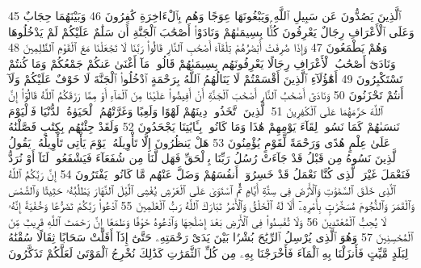 {\tiny\colorbox{cl_aya}{45}} ٱلَّذِينَ يَصُدُّونَ عَن سَبِيلِ ٱللَّهِ وَيَبْغُونَهَا عِوَجًا وَهُم بِٱلْءَاخِرَةِ كَٰفِرُونَ
{\tiny\colorbox{cl_aya}{46}} وَبَيْنَهُمَا حِجَابٌ وَعَلَى ٱلْأَعْرَافِ رِجَالٌ يَعْرِفُونَ كُلًّۢا بِسِيمَىٰهُمْ وَنَادَوْا۟ أَصْحَٰبَ ٱلْجَنَّةِ أَن سَلَٰمٌ عَلَيْكُمْ لَمْ يَدْخُلُوهَا وَهُمْ يَطْمَعُونَ
{\tiny\colorbox{cl_aya}{47}} وَإِذَا صُرِفَتْ أَبْصَٰرُهُمْ تِلْقَآءَ أَصْحَٰبِ ٱلنَّارِ قَالُوا۟ رَبَّنَا لَا تَجْعَلْنَا مَعَ ٱلْقَوْمِ ٱلظَّٰلِمِينَ
{\tiny\colorbox{cl_aya}{48}} وَنَادَىٰٓ أَصْحَٰبُ ٱلْأَعْرَافِ رِجَالًا يَعْرِفُونَهُم بِسِيمَىٰهُمْ قَالُوا۟ مَآ أَغْنَىٰ عَنكُمْ جَمْعُكُمْ وَمَا كُنتُمْ تَسْتَكْبِرُونَ
{\tiny\colorbox{cl_aya}{49}} أَهَٰٓؤُلَآءِ ٱلَّذِينَ أَقْسَمْتُمْ لَا يَنَالُهُمُ ٱللَّهُ بِرَحْمَةٍ ٱدْخُلُوا۟ ٱلْجَنَّةَ لَا خَوْفٌ عَلَيْكُمْ وَلَآ أَنتُمْ تَحْزَنُونَ
{\tiny\colorbox{cl_aya}{50}} وَنَادَىٰٓ أَصْحَٰبُ ٱلنَّارِ أَصْحَٰبَ ٱلْجَنَّةِ أَنْ أَفِيضُوا۟ عَلَيْنَا مِنَ ٱلْمَآءِ أَوْ مِمَّا رَزَقَكُمُ ٱللَّهُ قَالُوٓا۟ إِنَّ ٱللَّهَ حَرَّمَهُمَا عَلَى ٱلْكَٰفِرِينَ
{\tiny\colorbox{cl_aya}{51}} ٱلَّذِينَ ٱتَّخَذُوا۟ دِينَهُمْ لَهْوًا وَلَعِبًا وَغَرَّتْهُمُ ٱلْحَيَوٰةُ ٱلدُّنْيَا فَٱلْيَوْمَ نَنسَىٰهُمْ كَمَا نَسُوا۟ لِقَآءَ يَوْمِهِمْ هَٰذَا وَمَا كَانُوا۟ بِـَٔايَٰتِنَا يَجْحَدُونَ
{\tiny\colorbox{cl_aya}{52}} وَلَقَدْ جِئْنَٰهُم بِكِتَٰبٍ فَصَّلْنَٰهُ عَلَىٰ عِلْمٍ هُدًى وَرَحْمَةً لِّقَوْمٍ يُؤْمِنُونَ
{\tiny\colorbox{cl_aya}{53}} هَلْ يَنظُرُونَ إِلَّا تَأْوِيلَهُۥ يَوْمَ يَأْتِى تَأْوِيلُهُۥ يَقُولُ ٱلَّذِينَ نَسُوهُ مِن قَبْلُ قَدْ جَآءَتْ رُسُلُ رَبِّنَا بِٱلْحَقِّ فَهَل لَّنَا مِن شُفَعَآءَ فَيَشْفَعُوا۟ لَنَآ أَوْ نُرَدُّ فَنَعْمَلَ غَيْرَ ٱلَّذِى كُنَّا نَعْمَلُ قَدْ خَسِرُوٓا۟ أَنفُسَهُمْ وَضَلَّ عَنْهُم مَّا كَانُوا۟ يَفْتَرُونَ
{\tiny\colorbox{cl_aya}{54}} إِنَّ رَبَّكُمُ ٱللَّهُ ٱلَّذِى خَلَقَ ٱلسَّمَٰوَٰتِ وَٱلْأَرْضَ فِى سِتَّةِ أَيَّامٍ ثُمَّ ٱسْتَوَىٰ عَلَى ٱلْعَرْشِ يُغْشِى ٱلَّيْلَ ٱلنَّهَارَ يَطْلُبُهُۥ حَثِيثًا وَٱلشَّمْسَ وَٱلْقَمَرَ وَٱلنُّجُومَ مُسَخَّرَٰتٍۭ بِأَمْرِهِۦٓ أَلَا لَهُ ٱلْخَلْقُ وَٱلْأَمْرُ تَبَارَكَ ٱللَّهُ رَبُّ ٱلْعَٰلَمِينَ
{\tiny\colorbox{cl_aya}{55}} ٱدْعُوا۟ رَبَّكُمْ تَضَرُّعًا وَخُفْيَةً إِنَّهُۥ لَا يُحِبُّ ٱلْمُعْتَدِينَ
{\tiny\colorbox{cl_aya}{56}} وَلَا تُفْسِدُوا۟ فِى ٱلْأَرْضِ بَعْدَ إِصْلَٰحِهَا وَٱدْعُوهُ خَوْفًا وَطَمَعًا إِنَّ رَحْمَتَ ٱللَّهِ قَرِيبٌ مِّنَ ٱلْمُحْسِنِينَ
{\tiny\colorbox{cl_aya}{57}} وَهُوَ ٱلَّذِى يُرْسِلُ ٱلرِّيَٰحَ بُشْرًۢا بَيْنَ يَدَىْ رَحْمَتِهِۦ حَتَّىٰٓ إِذَآ أَقَلَّتْ سَحَابًا ثِقَالًا سُقْنَٰهُ لِبَلَدٍ مَّيِّتٍ فَأَنزَلْنَا بِهِ ٱلْمَآءَ فَأَخْرَجْنَا بِهِۦ مِن كُلِّ ٱلثَّمَرَٰتِ كَذَٰلِكَ نُخْرِجُ ٱلْمَوْتَىٰ لَعَلَّكُمْ تَذَكَّرُونَ
